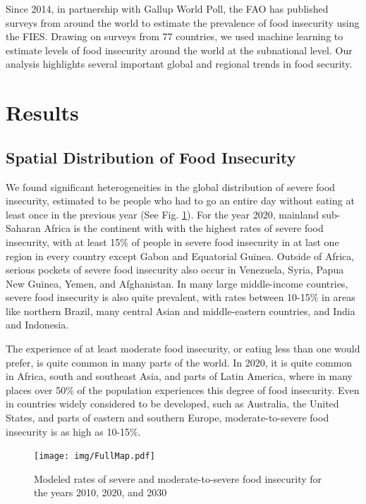 \documentclass{article}
\begin{document}
Since 2014, in partnership with Gallup World Poll, the FAO has published surveys from around the world to estimate the prevalence of food insecurity using the FIES.  Drawing on surveys from 77 countries, we used machine learning to estimate levels of food insecurity around the world at the subnational level.  Our analysis highlights several important global and regional trends in food security.


\section{Results}
\subsection{Spatial Distribution of Food Insecurity}
We found significant heterogeneities in the global distribution of severe food insecurity, estimated to be people who had to go an entire day without eating at least once in the previous year (See Fig. \ref{fig:map}).  For the year 2020, mainland sub-Saharan Africa is the continent with with the highest rates of severe food insecurity, with at least 15\% of people in severe food insecurity in at last one region in every country except Gabon and Equatorial Guinea.  Outside of Africa, serious pockets of severe food insecurity also occur in Venezuela, Syria, Papua New Guinea, Yemen, and Afghanistan.  In many large middle-income countries, severe food insecurity is also quite prevalent, with rates between 10-15\% in areas like northern Brazil, many central Asian and middle-eastern countries, and India and Indonesia.

The experience of at least moderate food insecurity, or eating less than one would prefer, is quite common in many parts of the world.  In 2020, it is quite common in Africa, south and southeast Asia, and parts of Latin America, where in many places over 50\% of the population experiences this degree of food insecurity.  Even in countries widely considered to be developed, such as Australia, the United States, and parts of eastern and southern Europe, moderate-to-severe food insecurity is as high as 10-15\%.  

\begin{landscape}
\begin{figure}[h]
  \centering
  \texttt{[image: img/FullMap.pdf]}
  \caption{Modeled rates of severe and moderate-to-severe food insecurity for the years 2010, 2020, and 2030}
  \label{fig:map}
\end{figure}
\end{landscape}
\end{document}
